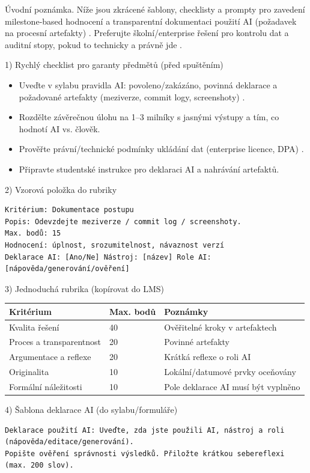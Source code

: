Úvodní poznámka. Níže jsou zkrácené šablony, checklisty a prompty pro zavedení milestone‑based hodnocení a transparentní dokumentaci použití AI (požadavek na procesní artefakty) \cite{kb_ai_101_tipu_pdf_04e4a115_page_8_1}. Preferujte školní/enterprise řešení pro kontrolu dat a auditní stopy, pokud to technicky a právně jde \cite{kb_ai_101_tipu_pdf_04e4a115_page_15_2}.

1) Rychlý checklist pro garanty předmětů (před spuštěním)
\begin{itemize}
  \item Uveďte v sylabu pravidla AI: povoleno/zakázáno, povinná deklarace a požadované artefakty (meziverze, commit logy, screenshoty) \cite{kb_ai_101_tipu_pdf_04e4a115_page_8_1}.
  \item Rozdělte závěrečnou úlohu na 1–3 milníky s jasnými výstupy a tím, co hodnotí AI vs. člověk.
  \item Prověřte právní/technické podmínky ukládání dat (enterprise licence, DPA) \cite{kb_ai_101_tipu_pdf_04e4a115_page_15_2}.
  \item Připravte studentské instrukce pro deklaraci AI a nahrávání artefaktů.
\end{itemize}

2) Vzorová položka do rubriky
\begin{verbatim}
Kritérium: Dokumentace postupu
Popis: Odevzdejte meziverze / commit log / screenshoty.
Max. bodů: 15
Hodnocení: úplnost, srozumitelnost, návaznost verzí
Deklarace AI: [Ano/Ne] Nástroj: [název] Role AI: [nápověda/generování/ověření]
\end{verbatim}

3) Jednoduchá rubrika (kopírovat do LMS)
\begin{center}
\begin{tabular}{p{6cm}p{1.5cm}p{6cm}}
\hline
Kritérium & Max. bodů & Poznámky \\
\hline
Kvalita řešení & 40 & Ověřitelné kroky v artefaktech \\
Proces a transparentnost & 20 & Povinné artefakty \\
Argumentace a reflexe & 20 & Krátká reflexe o roli AI \\
Originalita & 10 & Lokální/datumové prvky oceňovány \\
Formální náležitosti & 10 & Pole deklarace AI musí být vyplněno \\
\hline
\end{tabular}
\end{center}

4) Šablona deklarace AI (do sylabu/formuláře)
\begin{verbatim}
Deklarace použití AI: Uveďte, zda jste použili AI, nástroj a roli (nápověda/editace/generování).
Popište ověření správnosti výsledků. Přiložte krátkou sebereflexi (max. 200 slov).
\end{verbatim}

